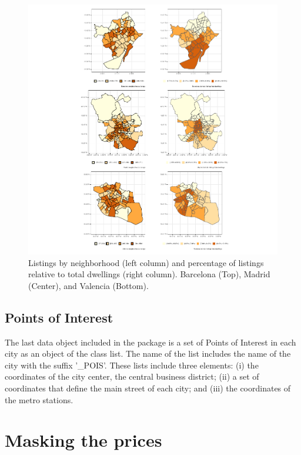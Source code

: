 \documentclass[Royal,times,sageh]{sagej}
\begin{document}
\begin{figure}
\centering
\includegraphics{main_EPB_files/figure-latex/figure-listings-1.pdf}
\caption{\label{fig:all-polygons}Listings by neighborhood (left column)
and percentage of listings relative to total dwellings (right column).
Barcelona (Top), Madrid (Center), and Valencia (Bottom).}
\end{figure}

\hypertarget{points-of-interest}{%
\subsection{Points of Interest}\label{points-of-interest}}

The last data object included in the package is a set of Points of
Interest in each city as an object of the class list. The name of the
list includes the name of the city with the suffix '\_POIS'. These lists
include three elements: (i) the coordinates of the city center, the
central business district; (ii) a set of coordinates that define the
main street of each city; and (iii) the coordinates of the metro
stations.

\hypertarget{anonymizing}{%
\section{Masking the prices}\label{anonymizing}}
\end{document}
